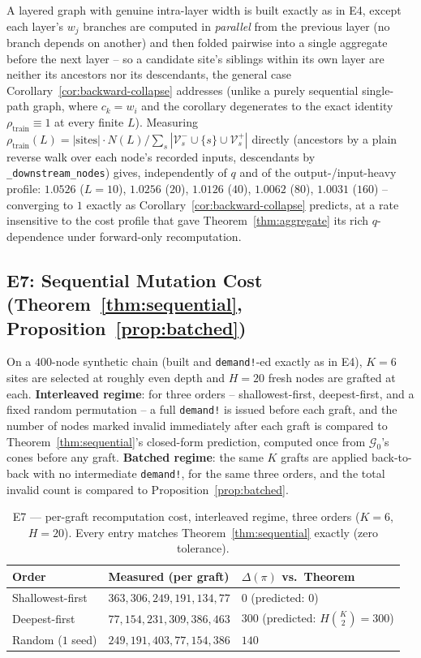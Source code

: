 \documentclass[11pt,a4paper]{article}
\newcommand{\G}{\mathcal{G}}
\newcommand{\V}{\mathcal{V}}
\begin{document}
A layered graph
with genuine intra-layer width is built exactly as in E4, except each layer's $w_j$ branches are
computed in \emph{parallel} from the previous layer (no branch depends on another) and then folded
pairwise into a single aggregate before the next layer -- so a candidate site's siblings within its
own layer are neither its ancestors nor its descendants, the general case
Corollary~\ref{cor:backward-collapse} addresses (unlike a purely sequential single-path graph, where
$c_k=w_i$ and the corollary degenerates to the exact identity $\rho_{\mathrm{train}}\equiv1$ at
every finite $L$). Measuring $\rho_{\mathrm{train}}(L) = \big|\text{sites}\big|\cdot N(L) /
\sum_s |\V_s^-\cup\{s\}\cup\V_s^+|$ directly (ancestors by a plain reverse walk over each node's
recorded inputs, descendants by \texttt{\_downstream\_nodes}) gives, independently of $q$ and of
the output-/input-heavy profile: $1.0526$ ($L{=}10$), $1.0256$ ($20$), $1.0126$ ($40$), $1.0062$
($80$), $1.0031$ ($160$) -- converging to $1$ exactly as Corollary~\ref{cor:backward-collapse}
predicts, at a rate insensitive to the cost profile that gave Theorem~\ref{thm:aggregate} its rich
$q$-dependence under forward-only recomputation.

\subsection{E7: Sequential Mutation Cost (Theorem~\ref{thm:sequential}, Proposition~\ref{prop:batched})}
\label{sec:e7}

On a $400$-node synthetic chain (built and \texttt{demand!}-ed exactly as in E4), $K=6$ sites are
selected at roughly even depth and $H=20$ fresh nodes are grafted at each. \textbf{Interleaved
regime}: for three orders -- shallowest-first, deepest-first, and a fixed random permutation -- a
full \texttt{demand!} is issued before each graft, and the number of nodes marked invalid
immediately after each graft is compared to Theorem~\ref{thm:sequential}'s closed-form prediction,
computed once from $\G_0$'s cones before any graft. \textbf{Batched regime}: the same $K$ grafts
are applied back-to-back with no intermediate \texttt{demand!}, for the same three orders, and the
total invalid count is compared to Proposition~\ref{prop:batched}.

\begin{table}[htbp]
\centering
\caption{E7 --- per-graft recomputation cost, interleaved regime, three orders ($K{=}6$, $H{=}20$). Every entry matches Theorem~\ref{thm:sequential} exactly (zero tolerance).}
\label{tab:e7}
\begin{tabular}{l l l}
\toprule
\textbf{Order} & \textbf{Measured (per graft)} & $\Delta(\pi)$ vs.\ Theorem \\
\midrule
Shallowest-first & $363, 306, 249, 191, 134, 77$ & $0$ (predicted: $0$) \\
Deepest-first     & $77, 154, 231, 309, 386, 463$ & $300$ (predicted: $H\binom{K}{2}=300$) \\
Random ($1$ seed) & $249, 191, 403, 77, 154, 386$ & $140$ \\
\bottomrule
\end{tabular}
\end{table}
\end{document}
